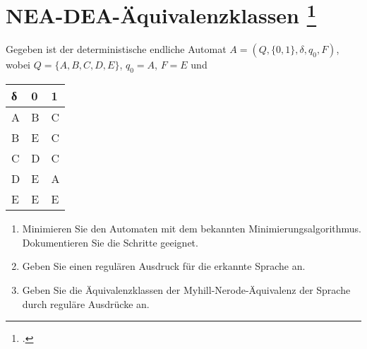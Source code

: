 \documentclass{lehramt-informatik-aufgabe}
\begin{document}
\section{NEA-DEA-Äquivalenzklassen
\footcite{theo:ab:1}}

Gegeben ist der deterministische endliche Automat $A = (Q, \{0, 1\},
\delta, q_0 , F)$, wobei $Q = \{A, B, C, D, E\}$, $q_0 = A$, $F = {E}$ und

\begin{center}
\begin{tabular}{l||l|l}
δ & 0 & 1 \\\hline\hline
A & B & C \\\hline
B & E & C \\\hline
C & D & C \\\hline
D & E & A \\\hline
E & E & E \\\hline
\end{tabular}
\end{center}

\begin{enumerate}
\item Minimieren Sie den Automaten mit dem bekannten
Minimierungsalgorithmus. Dokumentieren Sie die Schritte geeignet.

\item Geben Sie einen regulären Ausdruck für die erkannte Sprache an.

\item Geben Sie die Äquivalenzklassen der Myhill-Nerode-Äquivalenz der
Sprache durch reguläre Ausdrücke an.
\end{enumerate}
\end{document}
